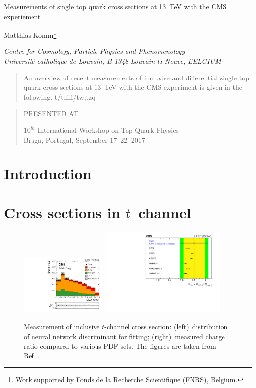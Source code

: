 \documentclass[12pt]{article}
\newcommand\pubnumber{}
\newcommand\pubdate{\today}
\def\institute{Centre for Cosmology, Particle Physics and Phenomenology\\
Universit\'e catholique de Louvain, B-1348 Louvain-la-Neuve, BELGIUM}
\def\support{\footnote{Work supported by Fonds de la Recherche Scientifique (FNRS), Belgium.}}
\def\Title#1{\begin{center} {\Large #1 } \end{center}}
\def\Author#1{\begin{center}{ \sc #1} \end{center}}
\def\Address#1{\begin{center}{ \it #1} \end{center}}
\newcommand\pubblock{\rightline{\begin{tabular}{l} \pubnumber\\
         \pubdate  \end{tabular}}}
\newenvironment{Abstract}{\begin{quotation}  }{\end{quotation}}
\newenvironment{Presented}{\begin{quotation} \begin{center} 
             PRESENTED AT\end{center}\bigskip 
      \begin{center}\begin{large}}{\end{large}\end{center} \end{quotation}}
\begin{document}
\begin{titlepage}
\pubblock

\vfill
\Title{Measurements of single top quark cross sections at 13~TeV with the CMS experiement}
\vfill
\Author{Matthias Komm\support}
\Address{\institute}
\vfill
\begin{Abstract}
An overview of recent measurements of inclusive and differential single top quark cross sections at 13~TeV with the CMS experiment is given in the following. t/tdiff/tw,tzq
\end{Abstract}
\vfill
\begin{Presented}
$10^{th}$ International Workshop on Top Quark Physics\\
Braga, Portugal,  September 17--22, 2017
\end{Presented}
\vfill
\end{titlepage}
\def\thefootnote{\fnsymbol{footnote}}
\setcounter{footnote}{0}
%

\section{Introduction}


\section{Cross sections in $t$~channel}

\begin{figure}[!htb]
\begin{center}
\includegraphics[width=0.38\textwidth]{tch-nn.pdf}\hspace{0.02\textwidth}
\includegraphics[width=0.55\textwidth]{tch-ratio.pdf}
\caption{Measurement of inclusive $t$-channel cross section: (left)~distribution of neural network discriminant for fitting; (right)~measured charge ratio compared to various PDF sets. The figures are taken from Ref~\cite{tchannel-inc}.}
\end{center}
\end{figure}
\end{document}
